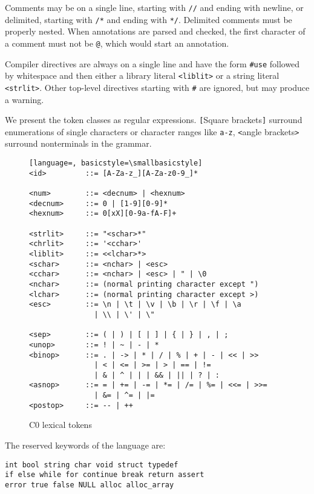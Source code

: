 \documentclass[11pt]{article}
\begin{document}
Comments may be on a single line, starting with \lstinline'//'
and ending with newline, or delimited, starting with
\lstinline'/*' and ending with \lstinline'*/'.  Delimited comments
must be properly nested.  When annotations are parsed and
checked, the first character of a comment must not be
\lstinline'@', which would start an annotation.

Compiler directives are always on a single line and have the form
\lstinline'#use' followed by whitespace and then either a library literal
\lstinline'<liblit>' or a string literal \lstinline'<strlit>'.  Other
top-level directives starting with \lstinline'#' are ignored, but
may produce a warning.

We present the token classes as regular expressions.  \lstinline'['Square
brackets\lstinline']' surround enumerations of single characters or
character ranges like \lstinline'a-z', \lstinline'<'angle brackets\lstinline'>'
surround nonterminals in the grammar.

\begin{figure}
\begin{lstlisting}[language=, basicstyle=\smallbasicstyle]
<id>         ::= [A-Za-z_][A-Za-z0-9_]*

<num>        ::= <decnum> | <hexnum>
<decnum>     ::= 0 | [1-9][0-9]*
<hexnum>     ::= 0[xX][0-9a-fA-F]+

<strlit>     ::= "<schar>*"
<chrlit>     ::= '<cchar>'
<liblit>     ::= <<lchar>*>
<schar>      ::= <nchar> | <esc>
<cchar>      ::= <nchar> | <esc> | " | \0
<nchar>      ::= (normal printing character except ")
<lchar>      ::= (normal printing character except >)
<esc>        ::= \n | \t | \v | \b | \r | \f | \a
               | \\ | \' | \"

<sep>        ::= ( | ) | [ | ] | { | } | , | ;
<unop>       ::= ! | ~ | - | *
<binop>      ::= . | -> | * | / | % | + | - | << | >>
               | < | <= | >= | > | == | !=
               | & | ^ | | | && | || | ? | :
<asnop>      ::= = | += | -= | *= | /= | %= | <<= | >>=
               | &= | ^= | |=
<postop>     ::= -- | ++
\end{lstlisting}
\caption{C0 lexical tokens}
\label{fig:tokens}
\end{figure}

The reserved keywords of the language are:
\begin{lstlisting}
int bool string char void struct typedef
if else while for continue break return assert
error true false NULL alloc alloc_array
\end{lstlisting}
\end{document}
